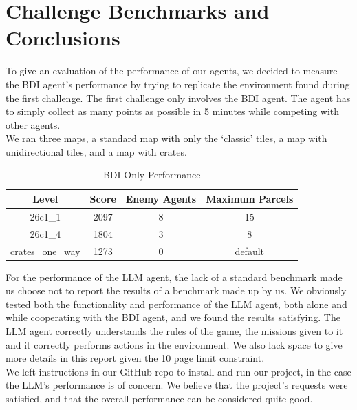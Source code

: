 \documentclass[11pt,a4paper]{article}
\begin{document}
\section{Challenge Benchmarks and Conclusions}
To give an evaluation of the performance of our agents, we decided to measure the BDI agent's performance by trying to replicate the environment found during the first challenge.
The first challenge only involves the BDI agent. The agent has to simply collect as many points as possible in 5 minutes while competing with other agents.
\\We ran three maps, a standard map with only the `classic' tiles, a map with unidirectional tiles, and a map with crates.
\begin{table}[H]
    \centering
    \caption{BDI Only Performance}
    \begin{tabular}{cccc}
        \toprule
        \textbf{Level} & \textbf{Score} & \textbf{Enemy Agents} & \textbf{Maximum Parcels} \\
        \midrule
        {26c1\_1} & {2097} & {8} & {15} \\
        {26c1\_4} & {1804} & {3} & {8} \\
        {crates\_one\_way} & {1273} & {0} & {default} \\
        \bottomrule
    \end{tabular}
\end{table}
For the performance of the LLM agent, the lack of a standard benchmark made us choose not to report the results of a benchmark made up by us.
We obviously tested both the functionality and performance of the LLM agent, both alone and while cooperating with the BDI agent, and we found the results satisfying.
The LLM agent correctly understands the rules of the game, the missions given to it and it correctly performs actions in the environment.
We also lack space to give more details in this report given the 10 page limit constraint. 
\\We left instructions in our GitHub repo to install and run our project, in the case the LLM's performance is of concern.
We believe that the project's requests were satisfied, and that the overall performance can be considered quite good.
\end{document}
